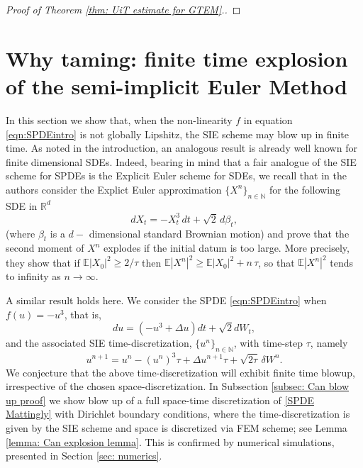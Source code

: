 \documentclass[reqno, 11pt]{amsart}
\theoremstyle{plain}
\theoremstyle{definition}
\theoremstyle{remark}
\numberwithin{equation}{section}
\numberwithin{theorem}{section}
\newcommand{\Dt}{\tau}
\newcommand{\E}{\mathbb{E}}
\newcommand{\R}{\mathbb{R}}
\newcommand{\N}{\mathbb{N}}
\newcommand{\be}{\begin{equation}}
\newcommand{\ee}{\end{equation}}
\begin{document}
{\begin{proof}[Proof of Theorem \ref{thm: UiT estimate for GTEM}.]
\end{proof}

\section{Why taming: finite time explosion of the semi-implicit Euler Method}\label{sec: why taming}
In this section we show that, when the non-linearity $f$ in equation \eqref{eqn:SPDEintro} is not globally Lipshitz, the SIE scheme may blow up in finite time. As noted in the introduction, an analogous result is already well known for finite dimensional SDEs. Indeed, bearing in mind that a fair analogue of the SIE scheme for SPDEs is the Explicit Euler scheme for SDEs, we recall that   in \cite[Lemma 6.3]{mattingly2002ergodicity} the authors consider the Explict Euler approximation 
$\{X^n\}_{n\in \N}$ for the following SDE in $\R^d$
\be\label{SDE Mattingly}
dX_t= -X_t^3 \, dt  + \sqrt{2}\,  d\beta_t, 
\ee
(where $\beta_t$ is a $d-$ dimensional standard Brownian motion) and prove that the second moment of $X^n$ explodes if the initial datum is too large. More precisely, they show that if $\E |X_0|^2 \geq 2/\tau$ then $\E |X^n|^2 \geq \E |X_0|^2 + n\,  \tau $, so that $\E |X^n|^2$  tends to infinity as $n \rightarrow \infty$.   



A similar result holds here. We consider the SPDE \eqref{eqn:SPDEintro} when $f(u)=-u^3$,   that is, 
\begin{equation}\label{SPDE Mattingly}
    du = (-u^3 + \Delta u) dt + \sqrt{2  } dW_t,
\end{equation}
and the associated SIE time-discretization, $\{u^n\}_{n \in \N}$, with time-step $\tau$, namely
\begin{equation}\label{scheme:explicit Euler}
    u^{n+1} = u^n - (u^n)^3 \Dt  + \Delta u^{n+1} \Dt  + \sqrt{2 \Dt}  \, \delta W^n .
\end{equation}
We conjecture that the above time-discretization will exhibit finite time blowup, irrespective of the chosen space-discretization. 
In Subsection \ref{subsec: Can blow up proof} we show blow up of a full space-time discretization of \eqref{SPDE Mattingly} with Dirichlet boundary conditions, where the time-discretization is given by the SIE scheme and space is discretized via FEM scheme; see Lemma \ref{lemma: Can explosion lemma}.  This is confirmed by numerical simulations, presented in Section \ref{sec: numerics}.

}
\end{document}
